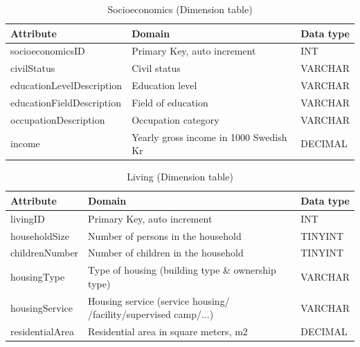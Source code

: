 \begin{table}[htbp]
  \centering
  \caption{Socioeconomics (Dimension table)}
  \begin{tabular}{|l|l|l|}
    \hline
    \textbf{Attribute} & \textbf{Domain} & \textbf{Data type} \\
    \hline
    socioeconomicsID & Primary Key, auto increment & INT \\
    \hline
    civilStatus & Civil status & VARCHAR \\
    \hline
    educationLevelDescription & Education level & VARCHAR \\
    \hline
    educationFieldDescription & Field of education & VARCHAR \\
    \hline
    occupationDescription & Occupation category & VARCHAR \\
    \hline
    income & Yearly gross income in 1000 Swedish Kr & DECIMAL \\
    \hline
  \end{tabular}
\end{table}

\begin{table}[htbp]
  \centering
  \caption{Living (Dimension table)}
  \begin{tabular}{|l|l|l|}
    \hline
    \textbf{Attribute} & \textbf{Domain} & \textbf{Data type} \\
    \hline
    livingID & Primary Key, auto increment & INT \\
    \hline
    householdSize & Number of persons in the household & TINYINT \\
    \hline
    childrenNumber & Number of children in the household & TINYINT \\
    \hline
    housingType & Type of housing (building type \& ownership type) & VARCHAR \\
    \hline
    housingService & Housing service (service housing/ /facility/supervised camp/...) & VARCHAR \\
    \hline
    residentialArea & Residential area in square meters, m2 & DECIMAL \\
    \hline
  \end{tabular}
\end{table}